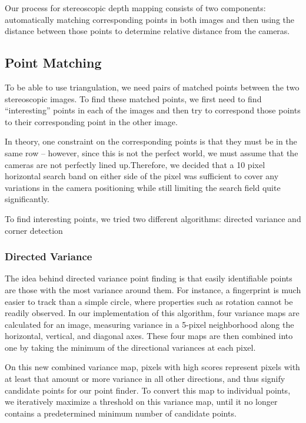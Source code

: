 Our process for stereoscopic depth mapping consists of two components: automatically matching corresponding points in both images and then using the distance between those points to determine relative distance from the cameras. 

\subsection{Point Matching}
To be able to use triangulation, we need pairs of matched points between the two stereoscopic images. To find these matched points, we first need to find ``interesting'' points in each of the images and then try to correspond those points to their corresponding point in the other image. 

In theory, one constraint on the corresponding points is that they must be in the same row -- however, since this is not the perfect world, we must assume that the cameras are not perfectly lined up.Therefore, we decided that a 10 pixel horizontal search band on either side of the pixel was sufficient to cover any variations in the camera positioning while still limiting the search field quite significantly. 

To find interesting points, we tried two different algorithms: directed variance and corner detection

\subsubsection{Directed Variance}
The idea behind directed variance point finding is that easily identifiable points are those with the most variance around them. For instance, a fingerprint is much easier to track than a simple circle, where properties such as rotation cannot be readily observed. In our implementation of this algorithm, four variance maps are calculated for an image, measuring variance in a 5-pixel neighborhood along the horizontal, vertical, and diagonal axes. These four maps are then combined into one by taking the minimum of the directional variances at each pixel.

On this new combined variance map, pixels with high scores represent pixels with at least that amount or more variance in all other directions, and thus signify candidate points for our point finder. To convert this map to individual points, we iteratively maximize a threshold on this variance map, until it no longer contains a predetermined minimum number of candidate points.

